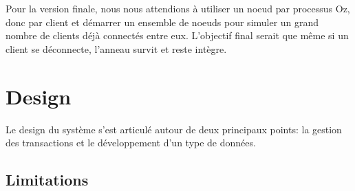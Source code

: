 \documentclass{article}
\begin{document}
	Pour la version finale, nous nous attendions à utiliser un noeud par processus Oz, donc par client et démarrer
	un ensemble de noeuds pour simuler un grand nombre de clients déjà connectés entre eux.  L'objectif final
	serait que même si un client se déconnecte, l'anneau survit et reste intègre.
	
	
	\section{Design}
	Le design du système s'est articulé autour de deux principaux points: la gestion des transactions et le développement
	d'un type de données.
	
	
	\subsection{Limitations}
	 
\end{document}

